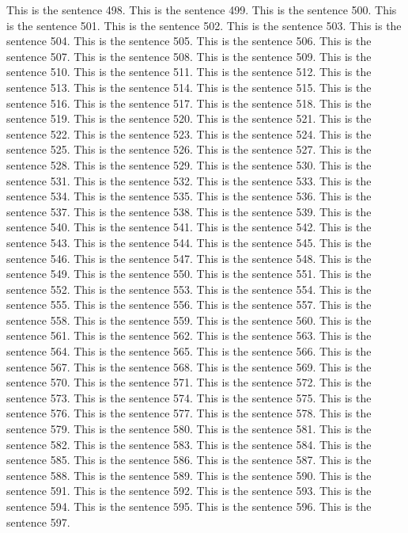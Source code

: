 \documentclass{article}
\begin{document}
This is the sentence 498.
This is the sentence 499.
This is the sentence 500.
This is the sentence 501.
This is the sentence 502.
This is the sentence 503.
This is the sentence 504.
This is the sentence 505.
This is the sentence 506.
This is the sentence 507.
This is the sentence 508.
This is the sentence 509.
This is the sentence 510.
This is the sentence 511.
This is the sentence 512.
This is the sentence 513.
This is the sentence 514.
This is the sentence 515.
This is the sentence 516.
This is the sentence 517.
This is the sentence 518.
This is the sentence 519.
This is the sentence 520.
This is the sentence 521.
This is the sentence 522.
This is the sentence 523.
This is the sentence 524.
This is the sentence 525.
This is the sentence 526.
This is the sentence 527.
This is the sentence 528.
This is the sentence 529.
This is the sentence 530.
This is the sentence 531.
This is the sentence 532.
This is the sentence 533.
This is the sentence 534.
This is the sentence 535.
This is the sentence 536.
This is the sentence 537.
This is the sentence 538.
This is the sentence 539.
This is the sentence 540.
This is the sentence 541.
This is the sentence 542.
This is the sentence 543.
This is the sentence 544.
This is the sentence 545.
This is the sentence 546.
This is the sentence 547.
This is the sentence 548.
This is the sentence 549.
This is the sentence 550.
This is the sentence 551.
This is the sentence 552.
This is the sentence 553.
This is the sentence 554.
This is the sentence 555.
This is the sentence 556.
This is the sentence 557.
This is the sentence 558.
This is the sentence 559.
This is the sentence 560.
This is the sentence 561.
This is the sentence 562.
This is the sentence 563.
This is the sentence 564.
This is the sentence 565.
This is the sentence 566.
This is the sentence 567.
This is the sentence 568.
This is the sentence 569.
This is the sentence 570.
This is the sentence 571.
This is the sentence 572.
This is the sentence 573.
This is the sentence 574.
This is the sentence 575.
This is the sentence 576.
This is the sentence 577.
This is the sentence 578.
This is the sentence 579.
This is the sentence 580.
This is the sentence 581.
This is the sentence 582.
This is the sentence 583.
This is the sentence 584.
This is the sentence 585.
This is the sentence 586.
This is the sentence 587.
This is the sentence 588.
This is the sentence 589.
This is the sentence 590.
This is the sentence 591.
This is the sentence 592.
This is the sentence 593.
This is the sentence 594.
This is the sentence 595.
This is the sentence 596.
This is the sentence 597.
\end{document}
